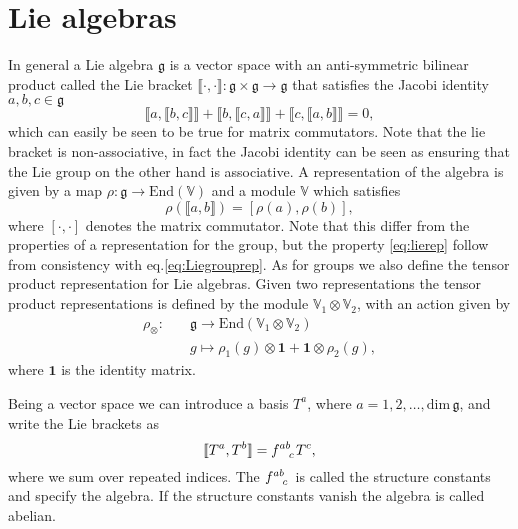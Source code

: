 \section{Lie algebras}\label{sec:Liealgebras}
In general a Lie algebra $\mathfrak{g}$ is a vector space with an anti-symmetric bilinear product called the Lie bracket $\llbracket\cdot,\cdot\rrbracket: \mathfrak{g}\times\mathfrak{g}\to\mathfrak{g}$ that satisfies the Jacobi identity $a,b,c\in\mathfrak{g}$
\begin{equation}
\llbracket a,\llbracket b,c\rrbracket\rrbracket+\llbracket b,\llbracket c,a\rrbracket\rrbracket+\llbracket c,\llbracket a,b\rrbracket\rrbracket=0, 
\end{equation}
which can easily be seen to be true for matrix commutators. Note that the lie bracket is non-associative, in fact the Jacobi identity can be seen as ensuring that the Lie group on the other hand is associative. A representation of the algebra is given by a map $\rho: \mathfrak{g}\to \text{End}(\mathbb{V})$ and a module $\mathbb{V}$ which satisfies
\begin{equation}\label{eq:lierep}
    \rho(\llbracket a,b\rrbracket) = [\rho(a),\rho(b)],
\end{equation}
where $[\cdot,\cdot]$ denotes the matrix commutator. Note that this differ from the properties of a representation for the group, but the property \eqref{eq:lierep} follow from consistency with eq.\eqref{eq:Liegrouprep}. As for groups we also define the tensor product representation for Lie algebras. Given two representations the tensor product representations is defined by the module $\mathbb{V}_1\otimes\mathbb{V}_2$, with an action given by 
\begin{equation}
    \begin{aligned}
        \rho_\otimes:\quad &\mathfrak{g}\to\text{End}\left(\mathbb{V}_1\otimes\mathbb{V}_2\right) \\
                & g\mapsto \rho_1(g)\otimes \mathbf{1}+\mathbf{1}\otimes\rho_2(g),
    \end{aligned}
\end{equation}
where $\mathbf{1}$ is the identity matrix.


Being a vector space we can introduce a basis $T^a$, where $a=1,2,\ldots,\text{dim}\,\mathfrak{g}$, and write the Lie brackets as 
\begin{equation}
    \llbracket T^a,T^b\rrbracket = \tensor{f}{^{ab}_c} T^c,
\end{equation}
where we sum over repeated indices. The $\tensor{f}{^{ab}_c}$ is called the structure constants and specify the algebra. If the structure constants vanish the algebra is called abelian.

